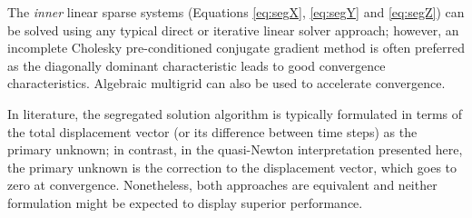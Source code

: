 \documentclass[sn-mathphys,Numbered]{sn-jnl}%
\begin{document}
The \emph{inner} linear sparse systems (Equations \ref{eq:segX}, \ref{eq:segY} and \ref{eq:segZ}) can be solved using any typical direct or iterative linear solver approach; however, an incomplete Cholesky pre-conditioned conjugate gradient method \cite{Jacobs1986} is often preferred as the diagonally dominant characteristic leads to good convergence characteristics.
Algebraic multigrid can also be used to accelerate convergence.
%

In literature, the segregated solution algorithm is typically formulated in terms of the total displacement vector (or its difference between time steps) as the primary unknown; in contrast, in the quasi-Newton interpretation presented here, the primary unknown is the correction to the displacement vector, which goes to zero at convergence.
Nonetheless, both approaches are equivalent and neither formulation might be expected to display superior performance.

\end{document}

